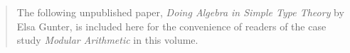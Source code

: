 










\makeatletter   

\def\thebibliography#1{\section{References} 
 \list {[\arabic{enumi}]}{\settowidth\labelwidth{[#1]}\leftmargin\labelwidth
 \advance\leftmargin\labelsep
 \usecounter{enumi}}
 \def\newblock{\hskip .11em plus .33em minus -.07em}
 \sloppy
 \sfcode`\.=1000\relax}
 \let\endthebibliography=\endlist

\makeatother

\reversemarginpar                            %



\thispagestyle{empty}
\setcounter{page}{1}		         %

\vspace*{5mm}
\vspace*{5mm}

\begin{quote} The  following  unpublished paper,  {\it Doing  Algebra in Simple
Type Theory\/} by Elsa Gunter, is included here for the  convenience of readers
of the case study {\it Modular Arithmetic\/} in this volume.
\end{quote}

\newpage
\thispagestyle{empty}
\mbox{}
\newpage
\setcounter{page}{1}		         %

